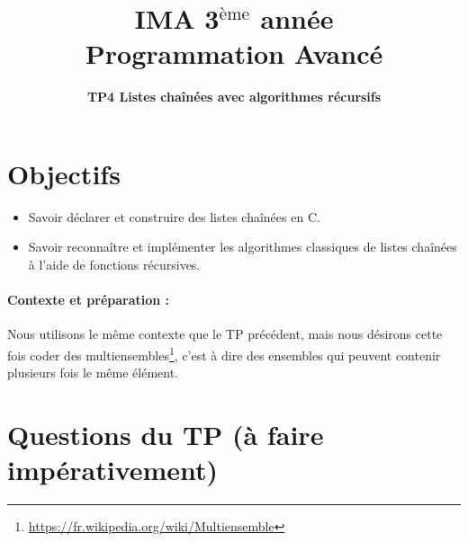 \documentclass[final, pdftex, a4paper, openbib, ]{article}
\title{IMA 3$^{\mbox{\`eme}}$ année\\ Programmation Avancé
}
\author{\huge \textbf{TP4 Listes chaînées avec algorithmes récursifs}}
\date{}
\begin{document}
\posttitle{\par\end{center}}
\setlength{\droptitle}{-45pt}
\maketitle

\vspace{-1.7cm}
\section{Objectifs}

\begin{itemize}
	\item Savoir déclarer et construire des listes chaînées en C.
	\item Savoir reconnaître et implémenter les algorithmes classiques de listes chaînées à l'aide de fonctions récursives.
\end{itemize}


\paragraph{Contexte et préparation : } Nous utilisons le même contexte que le TP précédent, mais nous désirons cette fois coder des multiensembles\footnote{\url{https://fr.wikipedia.org/wiki/Multiensemble}}, c'est à dire des ensembles qui peuvent contenir plusieurs fois le même élément.



\section{Questions du TP \large (à faire impérativement)}
\end{document}
